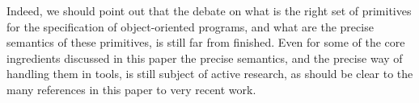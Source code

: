 \documentclass{llncs}
\begin{document}
Indeed, we should point out that the debate on what is the right set of 
primitives for the specification of object-oriented programs, and what 
are the precise semantics of these primitives, is still far from finished.
Even for some of the core ingredients discussed in this paper the precise
semantics, and the precise way of handling them in tools, is still subject
of active research, as should be clear to the many references in this paper 
to very recent work.



\end{document}

